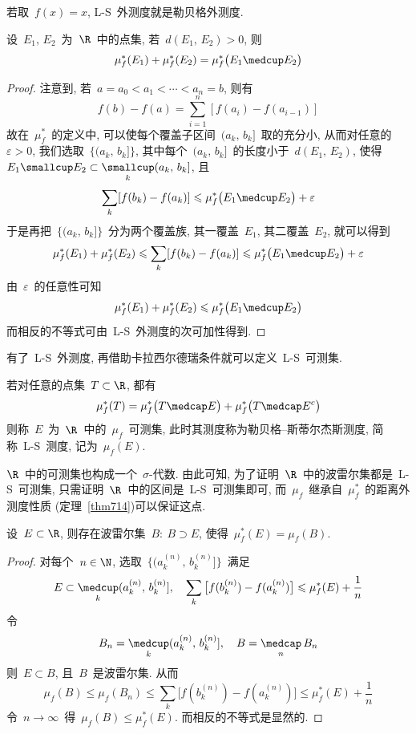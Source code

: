 若取~$f(x)=x$, L-S~外测度就是勒贝格外测度.

\begin{Theorem} \label{thm714}
设~$E_1,\,E_2$~为~$\R$~中的点集, 若~$d(E_1,\,E_2) > 0$, 则
\[
\mu_f^*(E_1) + \mu_f^*(E_2) = \mu_f^*\big(E_1 \medcup E_2\big)
\]
\end{Theorem}

\begin{proof}
注意到, 若~$a = a_0 < a_1 < \cdots < a_n =b$, 则有
\[
f(b)-f(a) = \sum_{i=1}^n [f(a_i)-f(a_{i-1})]
\]
故在~$\mu_f^*$~的定义中, 可以使每个覆盖子区间~$(a_k,\,b_k]$~取的充分小, 从而对任意的~$\varepsilon > 0$, 我们选取~$\big\{(a_k,\,b_k]\big\}$, 其中每个~$(a_k,\,b_k]$~的长度小于~$d(E_1,\,E_2)$, 使得~$E_1 \smallcup E_2 \subset \mathop{\textstyle{\smallcup}}\limits_k(a_k,\,b_k]$, 且
\[
\sum_k [f(b_k)-f(a_k)] \leqslant \mu_f^*\big( E_1 \medcup E_2 \big) + \varepsilon
\]
于是再把~$\big\{(a_k,\,b_k]\big\}$~分为两个覆盖族, 其一覆盖~$E_1$, 其二覆盖~$E_2$, 就可以得到
\[
\mu_f^*(E_1)+\mu_f^*(E_2) \leqslant \sum_k [f(b_k)-f(a_k)] \leqslant \mu_f^* \big(E_1 \medcup E_2 \big) + \varepsilon
\]
由~$\varepsilon$~的任意性可知
\[
\mu_f^*(E_1)+\mu_f^*(E_2) \leqslant \mu_f^*\big(E_1 \medcup E_2 \big)
\]
而相反的不等式可由~L-S~外测度的次可加性得到.
\end{proof}

有了~L-S~外测度, 再借助卡拉西尔德瑞条件就可以定义~L-S~可测集.

\begin{Definition}
若对任意的点集~$T \subset \R$, 都有
\[
\mu_f^*(T)=\mu_f^*\big(T \medcap E\big) + \mu_f^*\big(T \medcap E^c\big)
\]
则称~$E$~为~$\R$~中的~$\mu_f$~可测集, 此时其测度称为勒贝格--斯蒂尔杰斯测度, 简称~L-S~测度, 记为~$\mu_f(E)$.
\end{Definition}

$\R$~中的可测集也构成一个~$\sigma$-代数. 由此可知, 为了证明~$\R$~中的波雷尔集都是~L-S~可测集, 只需证明~$\R$~中的区间是~L-S~可测集即可, 而~$\mu_f$~继承自~$\mu_f^*$~的距离外测度性质
(定理~\ref{thm714})可以保证这点.

\begin{Theorem}
设~$E \subset \R$, 则存在波雷尔集~$B: \: B \supset E$, 使得~$\mu_f^*(E)=\mu_f(B)$.
\end{Theorem}

\begin{proof}
对每个~$n \in \N$, 选取~$\big\{ (a_k^{(n)},\,b_k^{(n)}] \big\}$~满足
\[
E \subset \mathop{\textstyle{\medcup}}_k (a_k^{(n)},\,b_k^{(n)}], \quad
\sum_k \big[ f(b_k^{(n)})-f(a_k^{(n)}) \big] \leqslant \mu_f^*(E) + \frac{1}{n}
\]
令
\[
B_n = \mathop{\textstyle{\medcup}}_k (a_k^{(n)},\,b_k^{(n)}], \quad B =  \mathop{\textstyle{\medcap}}_n B_n
\]
则~$E \subset B$, 且~$B$~是波雷尔集. 从而
\[
\mu_f(B) \leqslant \mu_f(B_n) \leqslant \sum_k \big[ f(b_k^{(n)})-f(a_k^{(n)}) \big] \leqslant \mu_f^*(E) + \frac{1}{n}
\]
令~$n \to \infty$~得~$\mu_f(B) \leqslant \mu_f^*(E)$. 而相反的不等式是显然的.
\end{proof}

